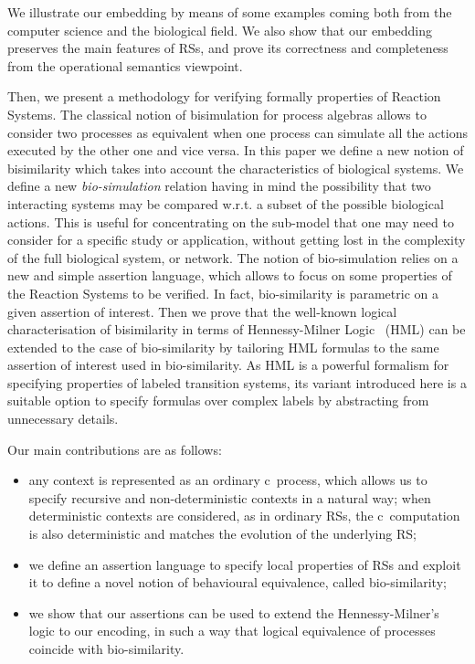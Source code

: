 We illustrate our embedding by means of some examples coming
both from the computer science and the biological field.
We also show that our embedding preserves the main
features of RSs, and prove its correctness and completeness
from the operational semantics viewpoint.

Then, we present a methodology for verifying formally
properties of Reaction Systems. The classical notion of bisimulation for 
process algebras allows to consider two processes as equivalent 
when one process can simulate all the actions executed 
by the other one and vice versa. In this paper we define a new
notion of bisimilarity which takes into account the characteristics
of biological systems. We define a new {\em bio-simulation} relation having in mind
the possibility that two interacting systems may be compared w.r.t.
a subset of the possible biological actions. This is useful for concentrating 
on the sub-model that one may need to consider for a specific study or application,
without getting lost in the complexity of the full biological system, or network.
The notion of bio-simulation relies on a new and simple assertion language,
which allows to focus on some properties of the Reaction Systems to be verified.
In fact, bio-similarity is parametric on a given assertion of interest.
Then we prove that the well-known logical characterisation of bisimilarity in terms of Hennessy-Milner Logic~\cite{HM80} (HML)
can be extended to the case of bio-similarity by tailoring HML formulas to
the same assertion of interest used in bio-similarity.  As HML is a powerful
formalism for specifying properties of labeled transition systems, 
its variant introduced here is a suitable option to specify formulas 
over complex labels by abstracting from unnecessary details.

Our main contributions are as follows:
\begin{itemize}
\item any context is represented as an ordinary c\CNA \ process, which allows us to specify recursive and non-deterministic contexts in a natural way; 
when deterministic contexts are considered, as in ordinary RSs, the c\CNA \
computation is also deterministic and matches the evolution of the underlying RS;
\item we define an assertion language to specify local properties of 
RSs and exploit it to define a novel notion of behavioural equivalence,
called bio-similarity;
\item we show that our assertions can be used to extend the Hennessy-Milner's logic to our 
encoding, in such a way that logical equivalence of processes coincide with bio-similarity.
\end{itemize}


